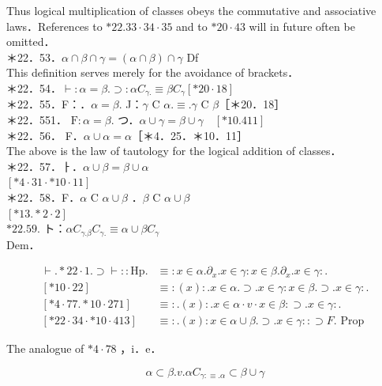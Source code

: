 \documentclass[10pt]{article}
\begin{document}
Thus logical multiplication of classes obeys the commutative and associative laws．References to $* 22.33 \cdot 34 \cdot 35$ and to $* 20 \cdot 43$ will in future often be omitted．\\
＊22．53．$\alpha \cap \beta \cap \gamma=(\alpha \cap \beta) \cap \gamma$ Df\\
This definition serves merely for the avoidance of brackets．\\
＊22．54．$\vdash: \alpha=\beta . \supset: \alpha C_{\gamma .} \equiv \beta C_{\gamma}[* 20 \cdot 18]$\\
＊22．55．F：．$\alpha=\beta$. J：$\gamma$ C $\alpha . \equiv . \gamma$ C $\beta$［＊20．18］\\
＊22．551． $\mathrm{F}: \alpha=\beta$. つ．$\alpha \cup \gamma=\beta \cup \gamma \quad[* 10.411]$\\
＊22．56． F．$\alpha \cup \alpha=\alpha$［＊4．25．＊10．11］\\
The above is the law of tautology for the logical addition of classes．\\
＊22．57．ㅏ．$\alpha \cup \beta=\beta \cup \alpha$\\
$[* 4 \cdot 31 \cdot * 10 \cdot 11]$\\
＊22．58．F．$\alpha$ C $\alpha \cup \beta$ ．$\beta$ C $\alpha \cup \beta$\\
$[* 13 . * 2 \cdot 2]$\\
$* 22.59$. ト：$\alpha C_{\gamma . \beta} C_{\gamma .} \equiv \alpha \cup \beta C_{\gamma}$\\
Dem．

$$
\begin{aligned}
\vdash . * 22 \cdot 1 . \supset \vdash:: \mathrm{Hp} . & \equiv: x \in \alpha . \partial_{x} . x \in \gamma: x \in \beta . \partial_{x} . x \in \gamma: . \\
{[* 10 \cdot 22] } & \equiv:(x): . x \in \alpha . \supset . x \in \gamma: x \in \beta . \supset . x \in \gamma: . \\
{[* 4 \cdot 77 . * 10 \cdot 271] } & \equiv: .(x): . x \in \alpha \cdot v \cdot x \in \beta: \supset . x \in \gamma: . \\
{[* 22 \cdot 34 \cdot * 10 \cdot 413] } & \equiv: .(x): x \in \alpha \cup \beta . \supset . x \in \gamma:: \supset F . \text { Prop }
\end{aligned}
$$

The analogue of $* 4 \cdot 78$ ，i．e．

$$
\alpha \subset \beta . v . \alpha C_{\gamma: \equiv . \alpha} \subset \beta \cup \gamma
$$
\end{document}
